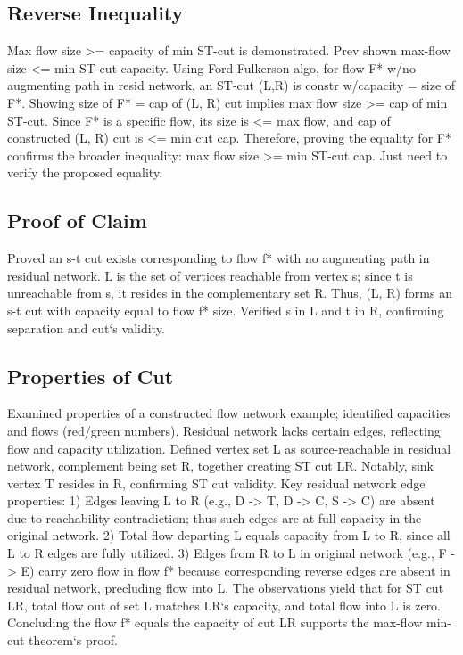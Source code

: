 \subsection*{Reverse Inequality}
Max flow size \textgreater{}= capacity of min ST-cut is demonstrated.
Prev shown max-flow size \textless{}= min ST-cut capacity.
Using Ford-Fulkerson algo, for flow F* w/no augmenting path in resid network, an ST-cut (L,R) is constr w/capacity = size of F*.
Showing size of F* = cap of (L, R) cut implies max flow size \textgreater{}= cap of min ST-cut.
Since F* is a specific flow, its size is \textless{}= max flow, and cap of constructed (L, R) cut is \textless{}= min cut cap.
Therefore, proving the equality for F* confirms the broader inequality: max flow size \textgreater{}= min ST-cut cap.
Just need to verify the proposed equality.

\subsection*{Proof of Claim}
Proved an s-t cut exists corresponding to flow f* with no augmenting path in residual network.
L is the set of vertices reachable from vertex s; since t is unreachable from s, it resides in the complementary set R\@.
Thus, (L, R) forms an s-t cut with capacity equal to flow f* size.
Verified s in L and t in R, confirming separation and cut`s validity.

\subsection*{Properties of Cut}
Examined properties of a constructed flow network example; identified capacities and flows (red/green numbers).
Residual network lacks certain edges, reflecting flow and capacity utilization.
Defined vertex set L as source-reachable in residual network, complement being set R, together creating ST cut LR\@.
Notably, sink vertex T resides in R, confirming ST cut validity.
Key residual network edge properties: 1) Edges leaving L to R (e.g., D -\textgreater{} T, D -\textgreater{} C, S -\textgreater{} C) are absent due to reachability contradiction; thus such edges are at full capacity in the original network.
2) Total flow departing L equals capacity from L to R, since all L to R edges are fully utilized.
3) Edges from R to L in original network (e.g., F -\textgreater{} E) carry zero flow in flow f* because corresponding reverse edges are absent in residual network, precluding flow into L\@.
The observations yield that for ST cut LR, total flow out of set L matches LR`s capacity, and total flow into L is zero.
Concluding the flow f* equals the capacity of cut LR supports the max-flow min-cut theorem`s proof.

